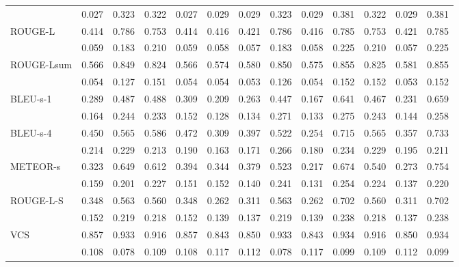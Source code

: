 \begin{table}[htbp]
\begin{adjustbox}{max width=\textwidth}
\begin{tabular}{@{}l*{12}{c}@{}}
                    & 0.027 & 0.323 & 0.322 & 0.027 & 0.029 & 0.029 & 0.323 & 0.029 & 0.381 & 0.322 & 0.029 & 0.381 \\
      \cmidrule(lr){2-13}
      ROUGE-L \cite{lin2004rouge}       & 0.414 & 0.786 & 0.753 & 0.414 & 0.416 & 0.421 & 0.786 & 0.416 & 0.785 & 0.753 & 0.421 & 0.785 \\
                    & 0.059 & 0.183 & 0.210 & 0.059 & 0.058 & 0.057 & 0.183 & 0.058 & 0.225 & 0.210 & 0.057 & 0.225 \\
      \cmidrule(lr){2-13}
      ROUGE-Lsum \cite{lin2004rouge}    & 0.566 & 0.849 & 0.824 & 0.566 & 0.574 & 0.580 & 0.850 & 0.575 & 0.855 & 0.825 & 0.581 & 0.855 \\
                    & 0.054 & 0.127 & 0.151 & 0.054 & 0.054 & 0.053 & 0.126 & 0.054 & 0.152 & 0.152 & 0.053 & 0.152 \\
      \cmidrule(lr){2-13}
      BLEU-s-1      & 0.289 & 0.487 & 0.488 & 0.309 & 0.209 & 0.263 & 0.447 & 0.167 & 0.641 & 0.467 & 0.231 & 0.659 \\
                    & 0.164 & 0.244 & 0.233 & 0.152 & 0.128 & 0.134 & 0.271 & 0.133 & 0.275 & 0.243 & 0.144 & 0.258 \\
      \cmidrule(lr){2-13}
      BLEU-s-4      & 0.450 & 0.565 & 0.586 & 0.472 & 0.309 & 0.397 & 0.522 & 0.254 & 0.715 & 0.565 & 0.357 & 0.733 \\
                    & 0.214 & 0.229 & 0.213 & 0.190 & 0.163 & 0.171 & 0.266 & 0.180 & 0.234 & 0.229 & 0.195 & 0.211 \\
      \cmidrule(lr){2-13}
      METEOR-s      & 0.323 & 0.649 & 0.612 & 0.394 & 0.344 & 0.379 & 0.523 & 0.217 & 0.674 & 0.540 & 0.273 & 0.754 \\
                    & 0.159 & 0.201 & 0.227 & 0.151 & 0.152 & 0.140 & 0.241 & 0.131 & 0.254 & 0.224 & 0.137 & 0.220 \\
      \cmidrule(lr){2-13}
      ROUGE-L-S     & 0.348 & 0.563 & 0.560 & 0.348 & 0.262 & 0.311 & 0.563 & 0.262 & 0.702 & 0.560 & 0.311 & 0.702 \\
                    & 0.152 & 0.219 & 0.218 & 0.152 & 0.139 & 0.137 & 0.219 & 0.139 & 0.238 & 0.218 & 0.137 & 0.238 \\
      \cmidrule(lr){2-13}
      VCS   & 0.857 & 0.933 & 0.916 & 0.857 & 0.843 & 0.850 & 0.933 & 0.843 & 0.934 & 0.916 & 0.850 & 0.934 \\
                    & 0.108 & 0.078 & 0.109 & 0.108 & 0.117 & 0.112 & 0.078 & 0.117 & 0.099 & 0.109 & 0.112 & 0.099 \\
      \bottomrule
    \end{tabular}
  \end{adjustbox}
\end{table}